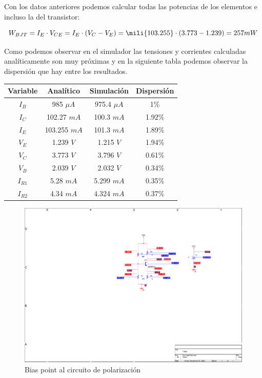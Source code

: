 Con los datos anteriores podemos calcular todas las potencias de los
elementos e incluso la del transistor:

\[W_{BJT} = I_E\cdot V_{CE}=I_E\cdot (V_C-V_E) = \mili{103.255}\cdot (3.773 -
  1.239) = 257 mW\]



Como podemos observar en el simulador las tensiones y corrientes
calculadas analíticamente son muy próximas y en la siguiente tabla
podemos observar la dispersión que hay entre los resultados.

\begin{center}
\begin{tabular}{| c | c | c | c |}
\hline
Variable & Analítico & Simulación  & Dispersión\\ \hline
  $I_B$ & 985 $\mu A$ & 975.4 $\mu A$ & 1\%\\
  $I_C$ & 102.27 $mA$ & 100.3 $mA$ & 1.92\%\\
  $I_E$ & 103.255 $mA$ & 101.3 $mA$ & 1.89\%\\
  $V_E$ & 1.239 $V$ & 1.215 $V$ & 1.94\%\\
  $V_C$ & 3.773 $V$ & 3.796 $V$ & 0.61\%\\
  $V_B$ & 2.039 $V$ & 2.032 $V$ & 0.34\% \\
  $I_{R1}$ & 5.28 $mA$ & 5.299 $mA$ & 0.35\%\\
  $I_{R2}$ & 4.34 $mA$ & 4.324 $mA$ & 0.37\%\\ \hline
\end{tabular}
\end{center}

  \begin{figure}[H]
    \centering  
    \includegraphics[scale=1,page=1,clip, trim=10cm 9.5cm 3cm 3cm]{images/circuito_bias_point.pdf}
    \caption{Bias point al circuito de polarización}
  \end{figure}

